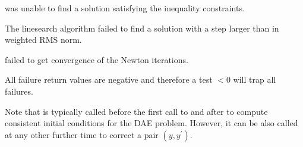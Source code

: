 {\begin{args}
  \item[\Id{IDA\_CONSTR\_FAIL}]
     was unable to find a solution    
    satisfying the inequality constraints.     
                                                                 
  \item[\Id{IDA\_LINESEARCH\_FAIL}]
    The linesearch algorithm failed to find a solution with a step larger than 
     in weighted RMS norm.                      
                                                                 
  \item[\Id{IDA\_CONV\_FAIL}]
     failed to get convergence of the Newton iterations.

  \end{args} 
}
{
  All failure return values are negative and therefore a test  $< 0$
  will trap all  failures.

  Note that  is typically called before the first call to 
  and after  to compute consistent initial conditions for the DAE problem. 
  However, it can be also called at any other further time to correct a pair $(y, y^\prime)$.
}



